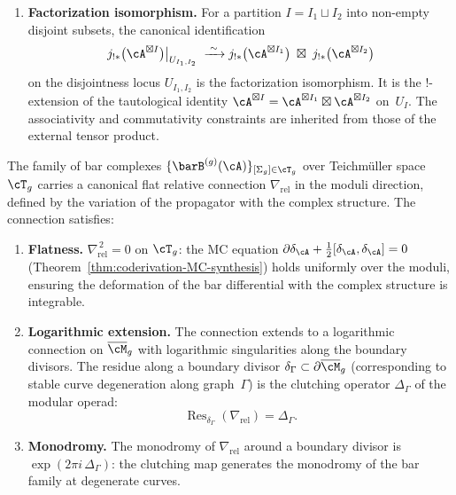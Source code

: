 \begin{construction}
\begin{enumerate}[label=\textup{(\roman*)}]
\item \textbf{Factorization isomorphism.} For a partition
 $I = I_1 \sqcup I_2$ into non-empty disjoint subsets, the
 canonical identification
 \begin{equation}\label{eq:!-tensor-split}
 j_{!*}\bigl(\cA^{\boxtimes I}\bigr)\big|_{U_{I_1,I_2}}
 \;\xrightarrow{\;\sim\;}
 j_{!*}\bigl(\cA^{\boxtimes I_1}\bigr)
 \;\boxtimes\;
 j_{!*}\bigl(\cA^{\boxtimes I_2}\bigr)
 \end{equation}
 on the disjointness locus $U_{I_1,I_2}$ is the factorization
 isomorphism. It is the $!$-extension of the tautological identity
 $\cA^{\boxtimes I} = \cA^{\boxtimes I_1} \boxtimes
 \cA^{\boxtimes I_2}$ on~$U_I$. The associativity and commutativity
 constraints are inherited from those of the external tensor product.
\end{enumerate}
\end{construction}

\begin{theorem}
\label{thm:relative-gauss-manin}
The family of bar complexes
$\{\barB^{(g)}(\cA)\}_{[\Sigma_g] \in \cT_g}$
over Teichm\"uller space $\cT_g$ carries a canonical flat relative
connection $\nabla_{\mathrm{rel}}$ in the moduli direction, defined by
the variation of the propagator with the complex structure. The
connection satisfies:
\begin{enumerate}[label=\textup{(\roman*)}]
\item \textbf{Flatness.}
 $\nabla_{\mathrm{rel}}^{\,2} = 0$ on $\cT_g$: the MC equation
 $\partial\delta_\cA + \frac{1}{2}[\delta_\cA, \delta_\cA] = 0$
 \textup{(}Theorem~\textup{\ref{thm:coderivation-MC-synthesis})}
 holds uniformly over the moduli, ensuring the deformation of the
 bar differential with the complex structure is integrable.

\item \textbf{Logarithmic extension.}
 The connection extends to a logarithmic connection on
 $\Mbar_g$ with logarithmic singularities along the boundary
 divisors. The residue along a boundary divisor
 $\delta_\Gamma \subset \partial\Mbar_g$
 \textup{(}corresponding to stable curve degeneration along
 graph~$\Gamma$\textup{)} is the clutching operator
 $\Delta_\Gamma$ of the modular operad:
 \[
 \operatorname{Res}_{\delta_\Gamma}(\nabla_{\mathrm{rel}})
 = \Delta_\Gamma.
 \]

\item \textbf{Monodromy.}
 The monodromy of $\nabla_{\mathrm{rel}}$ around a boundary
 divisor is $\exp(2\pi i \, \Delta_\Gamma)$: the clutching map
 generates the monodromy of the bar family at degenerate curves.
\end{enumerate}
\end{theorem}


